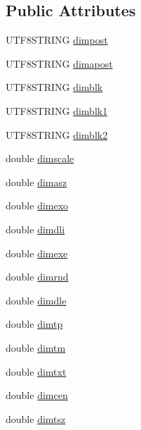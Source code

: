 \subsection*{Public Attributes}
\begin{DoxyCompactItemize}
\item 
U\+T\+F8\+S\+T\+R\+I\+N\+G \hyperlink{class_d_r_w___dimstyle_ab4484303cfced1d7ad3c19a84b19dada}{dimpost}
\item 
U\+T\+F8\+S\+T\+R\+I\+N\+G \hyperlink{class_d_r_w___dimstyle_a933deca82de6d15d82ada90f8731a00b}{dimapost}
\item 
U\+T\+F8\+S\+T\+R\+I\+N\+G \hyperlink{class_d_r_w___dimstyle_a2f64034b5654fee47038933c565a2e51}{dimblk}
\item 
U\+T\+F8\+S\+T\+R\+I\+N\+G \hyperlink{class_d_r_w___dimstyle_a33a57c5c614537649e042eef57a03f9d}{dimblk1}
\item 
U\+T\+F8\+S\+T\+R\+I\+N\+G \hyperlink{class_d_r_w___dimstyle_a65761962dbaff5d150f4a9296efeadfc}{dimblk2}
\item 
double \hyperlink{class_d_r_w___dimstyle_a2b9d92349258970f08efd3bd25d8cfd2}{dimscale}
\item 
double \hyperlink{class_d_r_w___dimstyle_ae0ea0ac39cd2e961ccf4c3b54c570967}{dimasz}
\item 
double \hyperlink{class_d_r_w___dimstyle_a22b63c5e53a889bfd549cc476e5bdd4a}{dimexo}
\item 
double \hyperlink{class_d_r_w___dimstyle_a6d13f43f1689621623c4193501ddb5cc}{dimdli}
\item 
double \hyperlink{class_d_r_w___dimstyle_af1d89fe302b0147db6db850a6382b743}{dimexe}
\item 
double \hyperlink{class_d_r_w___dimstyle_abe4aea95c5bf8eca979c33d94ea2bb07}{dimrnd}
\item 
double \hyperlink{class_d_r_w___dimstyle_a7aebc776b75660bc9947a90416bf8ab4}{dimdle}
\item 
double \hyperlink{class_d_r_w___dimstyle_a6596806a922534a220ce3b7f7b4bb415}{dimtp}
\item 
double \hyperlink{class_d_r_w___dimstyle_a80ccee76ee51137e11097fc61bc81329}{dimtm}
\item 
double \hyperlink{class_d_r_w___dimstyle_a8cc804b4094615949f6b314375d2e726}{dimtxt}
\item 
double \hyperlink{class_d_r_w___dimstyle_a3b2ea8efe76c60db85c14dcc8724a7f6}{dimcen}
\item 
double \hyperlink{class_d_r_w___dimstyle_a4b8018caf9bdf34b2002efce8929dc57}{dimtsz}
\item 

\end{DoxyCompactItemize}

